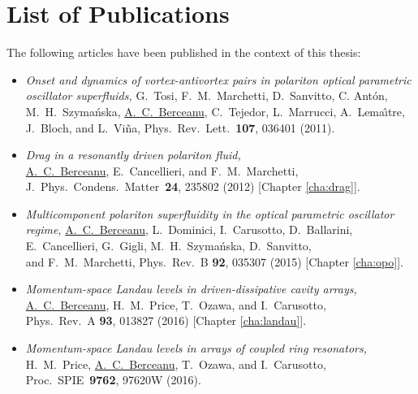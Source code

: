 \chapter*{List of Publications}

The following articles have been published in the context of this thesis:

\begin{itemize}



\item

  \emph{Onset and dynamics of vortex-antivortex pairs in polariton optical parametric oscillator superfluids,}
  G.~Tosi, F.~M.~Marchetti, D.~Sanvitto, C. Ant\'{o}n, M.~H.~Szyma\'{n}ska, \underline{A.~C.~Berceanu}, C.~Tejedor, L.~Marrucci, A.~Lema\^{\i}tre, J.~Bloch, and L.~Vi\~{n}a,
  Phys.\ Rev.\ Lett.\ \textbf{107}, 036401 (2011).

\item

  \emph{Drag in a resonantly driven polariton fluid,}\\
  \underline{A.~C.~Berceanu}, E.~Cancellieri, and F.~M.~Marchetti,\\
  J.\ Phys.\ Condens.\ Matter\ \textbf{24}, 235802 (2012) [Chapter \ref{cha:drag}].

\item

  \emph{Multicomponent polariton superfluidity in the optical parametric oscillator regime,}
  \underline{A.~C.~Berceanu}, L.~Dominici, I.~Carusotto, D.~Ballarini,\\
  E.~Cancellieri, G.~Gigli, M.~H.~Szyma\'{n}ska, D.~Sanvitto,\\ and F.~M.~Marchetti,
  Phys.\ Rev.\ B \textbf{92}, 035307 (2015) [Chapter \ref{cha:opo}].

\item

  \emph{Momentum-space Landau levels in driven-dissipative cavity arrays,}\\
  \underline{A.~C.~Berceanu}, H.~M.~Price, T.~Ozawa, and I.~Carusotto,\\
  Phys.\ Rev.\ A \textbf{93}, 013827 (2016) [Chapter \ref{cha:landau}].

\item

  \emph{Momentum-space Landau levels in arrays of coupled ring resonators,}\\
  H.~M.~Price, \underline{A.~C.~Berceanu}, T.~Ozawa, and I.~Carusotto,\\
  Proc.\ SPIE\ \textbf{9762}, 97620W (2016).


\end{itemize}



